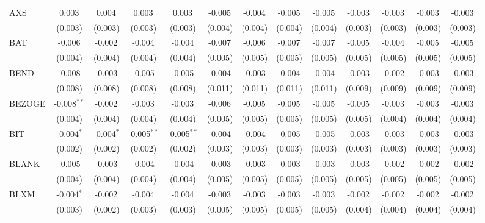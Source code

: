 \begin{table}[!htbp]
\begin{tabular}{@{\extracolsep{5pt}}lcccccccccccc}
 AXS & 0.003$^{}$ & 0.004$^{}$ & 0.003$^{}$ & 0.003$^{}$ & -0.005$^{}$ & -0.004$^{}$ & -0.005$^{}$ & -0.005$^{}$ & -0.003$^{}$ & -0.003$^{}$ & -0.003$^{}$ & -0.003$^{}$ \\
  & (0.003) & (0.003) & (0.003) & (0.003) & (0.004) & (0.004) & (0.004) & (0.004) & (0.003) & (0.003) & (0.003) & (0.003) \\
 BAT & -0.006$^{}$ & -0.002$^{}$ & -0.004$^{}$ & -0.004$^{}$ & -0.007$^{}$ & -0.006$^{}$ & -0.007$^{}$ & -0.007$^{}$ & -0.005$^{}$ & -0.004$^{}$ & -0.005$^{}$ & -0.005$^{}$ \\
  & (0.004) & (0.004) & (0.004) & (0.004) & (0.005) & (0.005) & (0.005) & (0.005) & (0.005) & (0.005) & (0.005) & (0.005) \\
 BEND & -0.008$^{}$ & -0.003$^{}$ & -0.005$^{}$ & -0.005$^{}$ & -0.004$^{}$ & -0.003$^{}$ & -0.004$^{}$ & -0.004$^{}$ & -0.003$^{}$ & -0.002$^{}$ & -0.003$^{}$ & -0.003$^{}$ \\
  & (0.008) & (0.008) & (0.008) & (0.008) & (0.011) & (0.011) & (0.011) & (0.011) & (0.009) & (0.009) & (0.009) & (0.009) \\
 BEZOGE & -0.008$^{**}$ & -0.002$^{}$ & -0.003$^{}$ & -0.003$^{}$ & -0.006$^{}$ & -0.005$^{}$ & -0.005$^{}$ & -0.005$^{}$ & -0.005$^{}$ & -0.003$^{}$ & -0.003$^{}$ & -0.003$^{}$ \\
  & (0.004) & (0.004) & (0.004) & (0.004) & (0.005) & (0.005) & (0.005) & (0.005) & (0.005) & (0.004) & (0.004) & (0.004) \\
 BIT & -0.004$^{*}$ & -0.004$^{*}$ & -0.005$^{**}$ & -0.005$^{**}$ & -0.004$^{}$ & -0.004$^{}$ & -0.005$^{}$ & -0.005$^{}$ & -0.003$^{}$ & -0.003$^{}$ & -0.003$^{}$ & -0.003$^{}$ \\
  & (0.002) & (0.002) & (0.002) & (0.002) & (0.003) & (0.003) & (0.003) & (0.003) & (0.003) & (0.003) & (0.003) & (0.003) \\
 BLANK & -0.005$^{}$ & -0.003$^{}$ & -0.004$^{}$ & -0.004$^{}$ & -0.003$^{}$ & -0.003$^{}$ & -0.003$^{}$ & -0.003$^{}$ & -0.003$^{}$ & -0.002$^{}$ & -0.002$^{}$ & -0.002$^{}$ \\
  & (0.004) & (0.004) & (0.004) & (0.004) & (0.005) & (0.005) & (0.005) & (0.005) & (0.005) & (0.005) & (0.005) & (0.005) \\
 BLXM & -0.004$^{*}$ & -0.002$^{}$ & -0.004$^{}$ & -0.004$^{}$ & -0.003$^{}$ & -0.003$^{}$ & -0.003$^{}$ & -0.003$^{}$ & -0.002$^{}$ & -0.002$^{}$ & -0.002$^{}$ & -0.002$^{}$ \\
  & (0.003) & (0.002) & (0.003) & (0.003) & (0.005) & (0.005) & (0.005) & (0.005) & (0.004) & (0.004) & (0.004) & (0.004) \\

\end{tabular}
\end{table}
